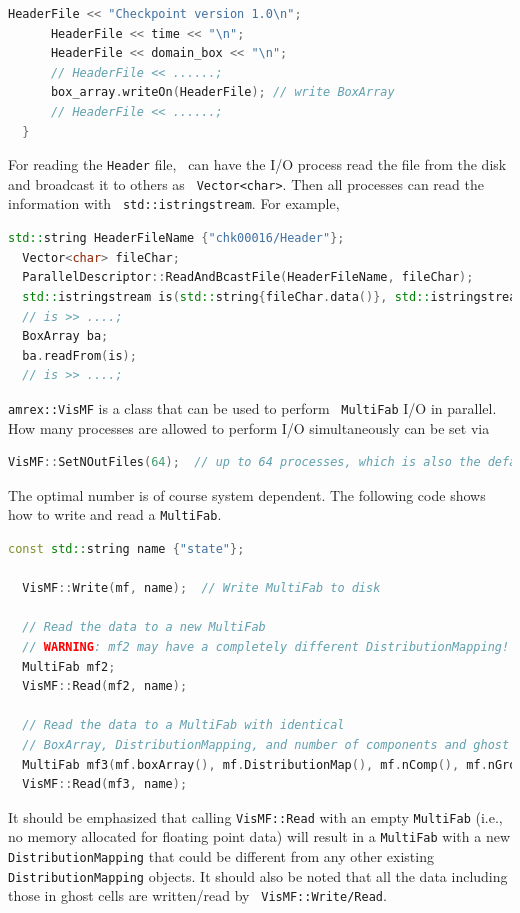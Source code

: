 {{\begin{lstlisting}[language=cpp]
      HeaderFile << "Checkpoint version 1.0\n";
      HeaderFile << time << "\n";
      HeaderFile << domain_box << "\n";
      // HeaderFile << ......;
      box_array.writeOn(HeaderFile); // write BoxArray
      // HeaderFile << ......;
  }
\end{lstlisting}
For reading the {\tt Header} file, \amrex\ can have the I/O process
read the file from the disk and broadcast it to others as {\tt
Vector<char>}.  Then all processes can read the information with {\tt
std::istringstream}.  For example,
\begin{lstlisting}[language=cpp]
  std::string HeaderFileName {"chk00016/Header"};
  Vector<char> fileChar;
  ParallelDescriptor::ReadAndBcastFile(HeaderFileName, fileChar);
  std::istringstream is(std::string{fileChar.data()}, std::istringstream::in);
  // is >> ....;
  BoxArray ba;
  ba.readFrom(is);
  // is >> ....;
\end{lstlisting}

{\tt amrex::VisMF} is a class that can be used to perform {\tt
  MultiFab} I/O in parallel.  How many processes are allowed to
perform I/O simultaneously can be set via
\begin{lstlisting}[language=cpp]
  VisMF::SetNOutFiles(64);  // up to 64 processes, which is also the default.
\end{lstlisting}
The optimal number is of course system dependent.  The following code
shows how to write and read a {\tt MultiFab}.
\begin{lstlisting}[language=cpp]
  const std::string name {"state"};

  VisMF::Write(mf, name);  // Write MultiFab to disk

  // Read the data to a new MultiFab
  // WARNING: mf2 may have a completely different DistributionMapping!
  MultiFab mf2;
  VisMF::Read(mf2, name);

  // Read the data to a MultiFab with identical
  // BoxArray, DistributionMapping, and number of components and ghost cells.
  MultiFab mf3(mf.boxArray(), mf.DistributionMap(), mf.nComp(), mf.nGrow());
  VisMF::Read(mf3, name);
\end{lstlisting}
It should be emphasized that calling {\tt VisMF::Read} with an empty
{\tt MultiFab} (i.e., no memory allocated for floating point data)
will result in a {\tt MultiFab} with a new {\tt DistributionMapping}
that could be different from any other existing {\tt
DistributionMapping} objects.  It should also be noted that all the
data including those in ghost cells are written/read by {\tt
VisMF::Write/Read}. 

}}
